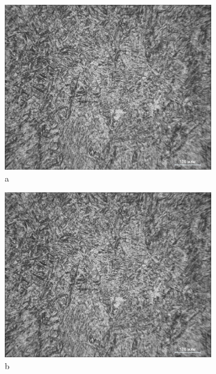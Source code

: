 \begin{figure}[H]
    \centering
    \begin{subfigure}[t]{0.3\textwidth}
        \centering
        \includegraphics[width=\textwidth]{media/ict2/image193}
        \caption*{a}
    \end{subfigure}
    \begin{subfigure}[t]{0.3\textwidth}
        \centering
        \includegraphics[width=\textwidth]{media/ict2/image194}
        \caption*{b}
    \end{subfigure}
    \begin{subfigure}[t]{0.3\textwidth}

\end{subfigure}
\end{figure}
